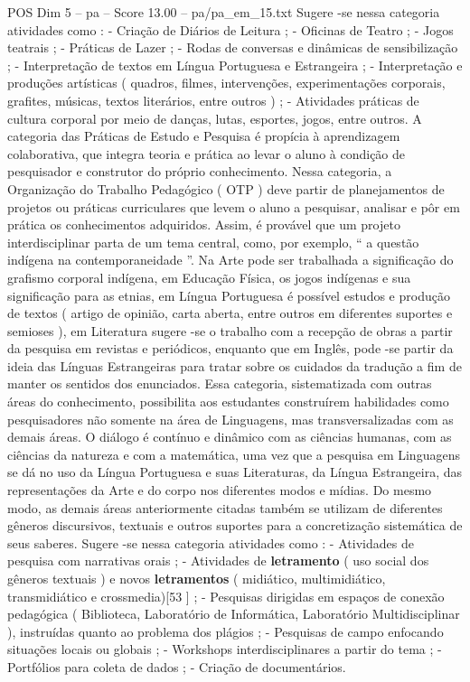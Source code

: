 \begin{textsample}{POS Dim 5 – pa – Score 13.00 – pa/pa\_em\_15.txt}
Sugere -se nessa categoria atividades como : - Criação de Diários de Leitura ; - Oficinas de Teatro ; - Jogos teatrais ; - Práticas de Lazer ; - Rodas de conversas e dinâmicas de sensibilização ; - Interpretação de textos em Língua Portuguesa e Estrangeira ; - Interpretação e produções artísticas ( quadros, filmes, intervenções, experimentações corporais, grafites, músicas, textos literários, entre outros ) ; - Atividades práticas de cultura corporal por meio de danças, lutas, esportes, jogos, entre outros.
A categoria das Práticas de Estudo e Pesquisa é propícia à aprendizagem colaborativa, que integra teoria e prática ao levar o aluno à condição de pesquisador e construtor do próprio conhecimento.
Nessa categoria, a Organização do Trabalho Pedagógico ( OTP ) deve partir de planejamentos de projetos ou práticas curriculares que levem o aluno a pesquisar, analisar e pôr em prática os conhecimentos adquiridos.
Assim, é provável que um projeto interdisciplinar parta de um tema central, como, por exemplo, “ a questão indígena na contemporaneidade ”.
Na Arte pode ser trabalhada a significação do grafismo corporal indígena, em Educação Física, os jogos indígenas e sua significação para as etnias, em Língua Portuguesa é possível estudos e produção de textos ( artigo de opinião, carta aberta, entre outros em diferentes suportes e semioses ), em Literatura sugere -se o trabalho com a recepção de obras a partir da pesquisa em revistas e periódicos, enquanto que em Inglês, pode -se partir da ideia das Línguas Estrangeiras para tratar sobre os cuidados da tradução a fim de manter os sentidos dos enunciados.
Essa categoria, sistematizada com outras áreas do conhecimento, possibilita aos estudantes construírem habilidades como pesquisadores não somente na área de Linguagens, mas transversalizadas com as demais áreas.
O diálogo é contínuo e dinâmico com as ciências humanas, com as ciências da natureza e com a matemática, uma vez que a pesquisa em Linguagens se dá no uso da Língua Portuguesa e suas Literaturas, da Língua Estrangeira, das representações da Arte e do corpo nos diferentes modos e mídias.
Do mesmo modo, as demais áreas anteriormente citadas também se utilizam de diferentes gêneros discursivos, textuais e outros suportes para a concretização sistemática de seus saberes.
Sugere -se nessa categoria atividades como : - Atividades de pesquisa com narrativas orais ; - Atividades de \textbf{letramento} ( uso social dos gêneros textuais ) e novos \textbf{letramentos} ( midiático, multimidiático, transmidiático e crossmedia)[53 ] ; - Pesquisas dirigidas em espaços de conexão pedagógica ( Biblioteca, Laboratório de Informática, Laboratório Multidisciplinar ), instruídas quanto ao problema dos plágios ; - Pesquisas de campo enfocando situações locais ou globais ; - Workshops interdisciplinares a partir do tema ; - Portfólios para coleta de dados ; - Criação de documentários.

\end{textsample}
